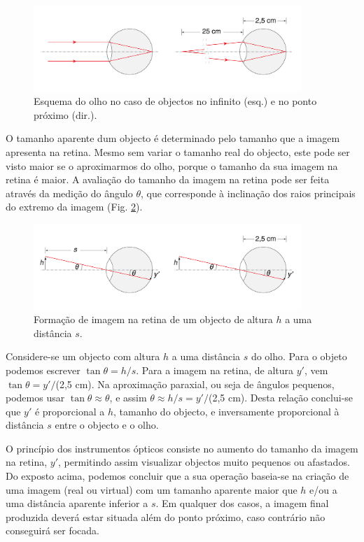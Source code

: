 \documentclass[a4paper,twoside,11pt]{report}      %
\begin{document}
\begin{figure}
	[!htb]  \centering 
	\includegraphics[width=0.9\textwidth]{olho-2}
	\caption{Esquema do olho no caso de objectos no infinito (esq.) e no ponto próximo (dir.). \label{fig:olho-2}} 
\end{figure}

O tamanho aparente dum objecto é determinado pelo tamanho que a imagem apresenta na retina. Mesmo sem variar o tamanho real do objecto, este pode ser visto maior se o aproximarmos do olho, porque o tamanho da sua imagem na retina é maior. A avaliação do tamanho da imagem na retina pode ser feita através da medição do ângulo $\theta$, que corresponde à inclinação dos raios principais do extremo da imagem (Fig. \ref{fig:olho-3}).

\begin{figure}
	[!htb]  \centering 
	\includegraphics[width=0.9\textwidth]{olho-3}
	\caption{Formação de imagem na retina de um objecto de altura $h$ a uma distância $s$. \label{fig:olho-3}} 
\end{figure}

Considere-se um objecto com altura $h$ a uma distância $s$ do olho. Para o objeto podemos escrever $\tan\theta=h/s$. Para a imagem na retina, de altura $y'$, vem $\tan\theta = y' /$(2,5 cm). Na aproximação paraxial, ou seja de ângulos pequenos, podemos usar $\tan\theta \approx\theta$, e assim $\theta\approx h/s=y'/$(2,5 cm). Desta relação conclui-se que $y'$ é proporcional a $h$, tamanho do objecto, e inversamente proporcional à distância $s$ entre o objecto e o olho. 


O princípio dos instrumentos ópticos consiste no aumento do tamanho da imagem na retina, $y'$, permitindo assim visualizar objectos muito pequenos ou afastados. Do exposto acima, podemos concluir que a sua operação baseia-se na criação de uma imagem (real ou virtual) com um tamanho aparente maior que $h$ e/ou 
 a uma distância aparente inferior a $s$. Em qualquer dos casos, a imagem final produzida deverá estar situada além do ponto próximo, caso contrário não conseguirá ser focada.
\end{document}
